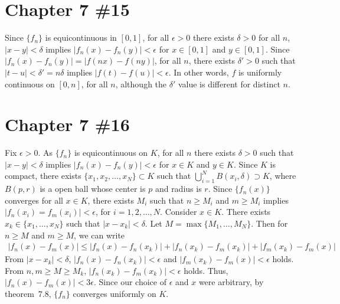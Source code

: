 \documentclass{scrartcl}
\begin{document}
\section{Chapter 7 \#15}
Since \(\{f_n\}\) is equicontinuous in \([0, 1]\), for all \(\epsilon > 0\)
there exists \(\delta > 0\) for all \(n\), \(|x - y| < \delta\) implies
\(|f_n(x) - f_n(y)| < \epsilon\) for \(x \in [0, 1]\) and \(y \in [0, 1]\).
Since \(|f_n(x) - f_n(y)| = |f(nx) - f(ny)|\), for all \(n\), there exists
\(\delta' > 0\) such that \(|t - u| < \delta' = n\delta\) implies \(|f(t) -
f(u)| < \epsilon\). In other words, \(f\) is uniformly continuous on \([0,
n]\), for all \(n\), although the \(\delta'\) value is different for distinct
\(n\).

\section{Chapter 7 \#16}
Fix \(\epsilon > 0\). As \(\{f_n\}\) is equicontinuous on \(K\), for all \(n\)
there exists \(\delta > 0\) such that \(|x - y| < \delta\) implies \(|f_n(x) -
f_n(y)| < \epsilon\) for \(x \in K\) and \(y \in K\). Since \(K\) is compact,
there exists \(\{x_1, x_2, \dots, x_N\} \subset K\) such that \(\bigcup^N_{i =
1} B(x_i, \delta) \supset K\), where \(B(p, r)\) is a open ball whose center is
\(p\) and radius is \(r\). Since \(\{f_n(x)\}\) converges for all \(x \in K\),
there exists \(M_i\) such that \(n \ge M_i\) and \(m \ge M_i\) implies
\(|f_n(x_i) = f_m(x_i)| < \epsilon\), for \(i = 1, 2, \dots, N\). Consider \(x
\in K\). There exists \(x_k \in \{x_1, \dots, x_N\}\) such that \(|x - x_k| <
\delta\). Let \(M = \max\{M_1, \dots, M_N\}\). Then for \(n \ge M\) and \(m \ge
M\), we can write
\begin{align*}
  |f_n(x) - f_m(x)|
  \le |f_n(x) - f_n(x_k)| + |f_n(x_k) - f_m(x_k)| + |f_m(x_k) - f_m(x)|
\end{align*}
From \(|x - x_k| < \delta\), \(|f_n(x) - f_n(x_k)| < \epsilon\) and \(|f_m(x_k)
- f_m(x)| < \epsilon\) holds. From \(n, m \ge M \ge M_k\), \(|f_n(x_k) -
f_m(x_k)| < \epsilon\) holds. Thus, \(|f_n(x) - f_m(x)| < 3\epsilon\). Since
our choice of \(\epsilon\) and \(x\) were arbitrary, by theorem~7.8,
\(\{f_n\}\) converges uniformly on \(K\).
\end{document}

